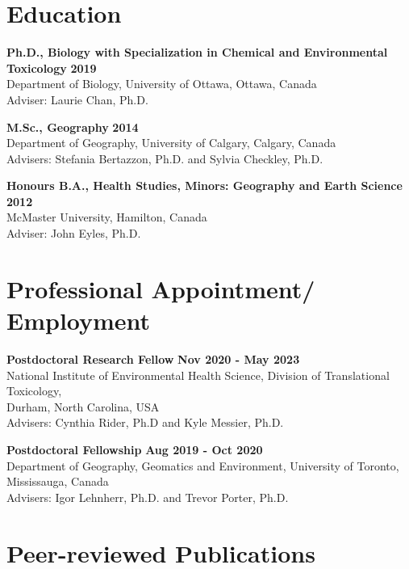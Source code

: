 \documentclass[margin,line]{res}
\begin{document}
\begin{resume}
\section{\sc Education}

\textbf{Ph.D., Biology with Specialization in Chemical and Environmental Toxicology} \hfill {\bf 2019}\\
Department of Biology, University of Ottawa, Ottawa, Canada \\
Adviser: Laurie Chan, Ph.D.

\textbf{M.Sc., Geography}  \hfill {\bf 2014}\\
Department of Geography, University of Calgary, Calgary, Canada\\
Advisers:  Stefania Bertazzon, Ph.D. and Sylvia Checkley, Ph.D.

\textbf{Honours B.A., Health Studies, Minors: Geography and Earth Science }\hfill {\bf 2012}\\
McMaster University, Hamilton, Canada\\
Adviser: John Eyles, Ph.D.

\vspace*{.1in}
\section{\sc Professional Appointment/ Employment}

{\bf  Postdoctoral Research Fellow} \hfill {\bf Nov 2020 - May 2023}\\
National Institute of Environmental Health Science, Division of Translational Toxicology,\\
Durham, North Carolina, USA\\
Advisers: Cynthia Rider, Ph.D and Kyle Messier, Ph.D.

{\bf Postdoctoral Fellowship} \hfill {\bf Aug 2019 - Oct 2020}\\
Department of Geography, Geomatics and Environment, University of Toronto, Mississauga, Canada\\
Advisers: Igor Lehnherr, Ph.D. and Trevor Porter, Ph.D.

\section{\sc Peer-reviewed Publications}



\end{resume}
\end{document}
